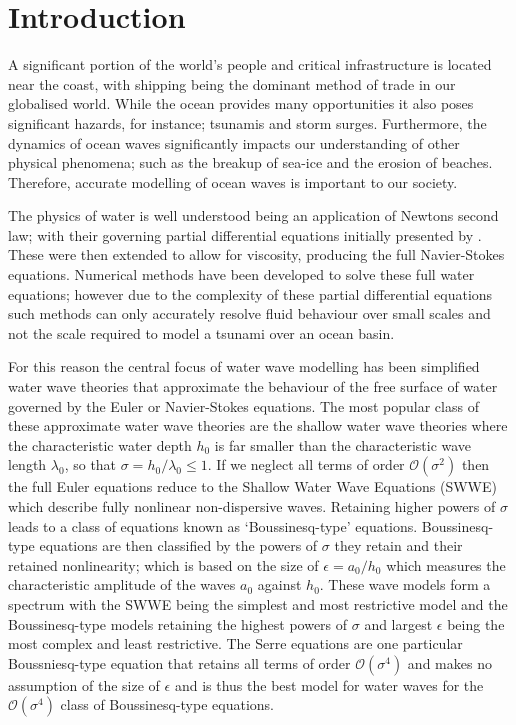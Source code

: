 
\chapter{Introduction}
\label{chp:Introduction}

A significant portion of the world's people and critical infrastructure is located near the coast, with shipping being the dominant method of trade in our globalised world. While the ocean provides many opportunities it also poses significant hazards, for instance; tsunamis and storm surges. Furthermore, the dynamics of ocean waves significantly impacts our understanding of other physical phenomena; such as the breakup of sea-ice and the erosion of beaches. Therefore, accurate modelling of ocean waves is important to our society. 

The physics of water is well understood being an application of Newtons second law; with their governing partial differential equations initially presented by \citet{Euler-1755-274}. These were then extended to allow for viscosity, producing the full Navier-Stokes equations. Numerical methods \cite{Chorin-1967-928,Taylor-Hood-1973-73,Bassi-1997-267} have been developed to solve these full water equations; however due to the complexity of these partial differential equations such methods can only accurately resolve fluid behaviour over small scales and not the scale required to model a tsunami over an ocean basin. 

For this reason the central focus of water wave modelling has been simplified water wave theories that approximate the behaviour of the free surface of water governed by the Euler or Navier-Stokes equations. The most popular class of these approximate water wave theories are the shallow water wave theories where the characteristic water depth $h_0$ is far smaller than the characteristic wave length $\lambda_0$, so that $\sigma = h_0 / \lambda_0 \le 1$. If we neglect all terms of order $\mathcal{O}\left(\sigma ^2\right)$ then the full Euler equations reduce to the Shallow Water Wave Equations (SWWE) \cite{Bonneton-Lannes-2009-16601} which describe fully nonlinear non-dispersive waves. Retaining higher powers of $\sigma$ leads to a class of equations known as `Boussinesq-type' equations. Boussinesq-type equations are then classified by the powers of $\sigma$ they retain and their retained nonlinearity; which is based on the size of $\epsilon= a_0 / h_0$ which measures the characteristic amplitude of the waves $a_0$ against $h_0$. These wave models form a spectrum with the SWWE being the simplest and most restrictive model and the Boussinesq-type models retaining the highest powers of $\sigma$ and largest $\epsilon$ being the most complex and least restrictive. The Serre equations are one particular Boussniesq-type equation that retains all terms of order $\mathcal{O}\left(\sigma ^4\right)$ and makes no assumption of the size of $\epsilon$ \cite{Bonneton-Lannes-2009-16601} and is thus the best model for water waves for the $\mathcal{O}\left(\sigma ^4\right)$ class of Boussinesq-type equations. 

